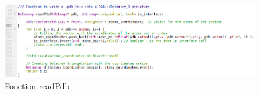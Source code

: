 \begin{figure}[ht]
\centering
  \includegraphics[width=\textwidth]{figures/readPdb.png}
  \caption{Fonction readPdb}
  \label{fig::read_pdb}
\end{figure}
